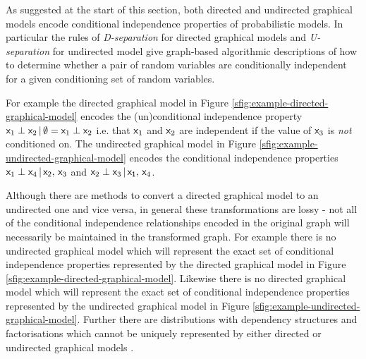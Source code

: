 As suggested at the start of this section, both directed and undirected graphical models encode conditional independence properties of probabilistic models. In particular the rules of \emph{D-separation} for directed graphical models and \emph{U-separation} for undirected model give graph-based algorithmic descriptions of how to determine whether a pair of random variables are conditionally independent for a given conditioning set of random variables. 

For example the directed graphical model in Figure \ref{sfig:example-directed-graphical-model} encodes the (un)conditional independence property $\mathsf{x}_1 \perp \mathsf{x}_2 \operatorname{|} \emptyset = \mathsf{x}_1 \perp \mathsf{x}_2$ i.e. that $\mathsf{x}_1$ and $\mathsf{x}_2$ are independent if the value of $\mathsf{x}_3$ is \emph{not} conditioned on. The undirected graphical model in Figure \ref{sfig:example-undirected-graphical-model} encodes the conditional independence properties $\mathsf{x}_1 \perp \mathsf{x}_4 \operatorname{|} \mathsf{x_2},\,\mathsf{x}_3$ and $\mathsf{x}_2 \perp \mathsf{x}_3 \operatorname{|} \mathsf{x_1},\,\mathsf{x}_4$.

Although there are methods to convert a directed graphical model to an undirected one and vice versa, in general these transformations are lossy - not all of the conditional independence relationships encoded in the original graph will necessarily be maintained in the transformed graph. For example there is no undirected graphical model which will represent the exact set of conditional independence properties represented by the directed graphical model in Figure \ref{sfig:example-directed-graphical-model}. Likewise there is no directed graphical model which will represent the exact set of conditional independence properties represented by the undirected graphical model in Figure \ref{sfig:example-undirected-graphical-model}. Further there are distributions with dependency structures and factorisations which cannot be uniquely represented by either directed or undirected graphical models \citep{frey2002extending}.

